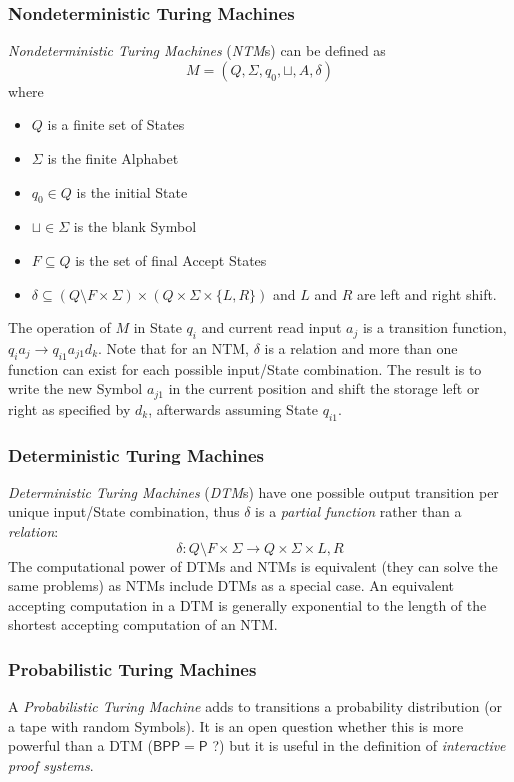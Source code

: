 \documentclass{article}
\begin{document}
\subsubsection{Nondeterministic Turing Machines}
\emph{Nondeterministic Turing Machines} (\emph{NTM}s) can be defined
as
    \[
        M = (Q, \Sigma, q_0, \sqcup, A, \delta)
    \]
where
\begin{itemize}
\item $Q$ is a finite set of States
\item $\Sigma$ is the finite Alphabet
\item $q_0 \in Q$ is the initial State
\item $\sqcup \in \Sigma$ is the blank Symbol
\item $F \subseteq Q$ is the set of final Accept States
\item $\delta \subseteq (Q \setminus F \times \Sigma) \times (Q \times
  \Sigma \times \{L,R\})$ and $L$ and $R$ are left and right shift.
\end{itemize}

The operation of $M$ in State $q_i$ and current read input $a_j$ is a
transition function, $q_i a_j \rightarrow q_{i1} a_{j1} d_k$. Note
that for an NTM, $\delta$ is a relation and more than one function can
exist for each possible input/State combination. The result is to
write the new Symbol $a_{j1}$ in the current position and shift the
storage left or right as specified by $d_k$, afterwards assuming State
$q_{i1}$.

\subsubsection{Deterministic Turing Machines}
\emph{Deterministic Turing Machines} (\emph{DTM}s) have one possible
output transition per unique input/State combination, thus $\delta$ is
a \emph{partial function} rather than a \emph{relation}:
\[
    \delta : Q \setminus F \times \Sigma \rightarrow Q \times
    \Sigma \times {L,R}
\]
The computational power of DTMs and NTMs is equivalent (they can solve
the same problems) as NTMs include DTMs as a special case. An
equivalent accepting computation in a DTM is generally exponential to
the length of the shortest accepting computation of an NTM.

\subsubsection{Probabilistic Turing Machines}
A \emph{Probabilistic Turing Machine} adds to transitions a
probability distribution (or a tape with random Symbols). It is an
open question whether this is more powerful than a DTM
($\mathsf{BPP}=\mathsf{P}$ ?)  but it is useful in the definition of
\emph{interactive proof systems}. %
\end{document}
